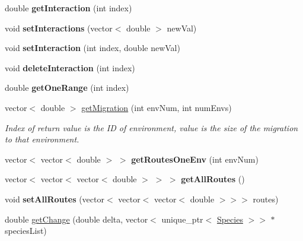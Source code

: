 \begin{DoxyCompactItemize}
\mbox{\label{classSpecies_a13bd812c3a366cf4a3bf9bd3e1e4d3fa}} 
double {\bfseries get\+Interaction} (int index)
\item 
\mbox{\label{classSpecies_a3cf0a84408e2e0e6981654dc4a9f4eeb}} 
void {\bfseries set\+Interactions} (vector$<$ double $>$ new\+Val)
\item 
\mbox{\label{classSpecies_a2158c22a9098d6591c829fb54611fc03}} 
void {\bfseries set\+Interaction} (int index, double new\+Val)
\item 
\mbox{\label{classSpecies_ab219377e317d2c8d07a0a207f52cf3f4}} 
void {\bfseries delete\+Interaction} (int index)
\item 
\mbox{\label{classSpecies_a3eeef473f91fe468ffd4d76964bb5f6f}} 
double {\bfseries get\+One\+Range} (int index)
\item 
vector$<$ double $>$ \hyperlink{classSpecies_a306aaa396cc99e223d46a577b14e1faf}{get\+Migration} (int env\+Num, int num\+Envs)
\begin{DoxyCompactList}\small\item\em Index of return value is the ID of environment, value is the size of the migration to that environment. \end{DoxyCompactList}\item 
\mbox{\label{classSpecies_a43a78cb3d46d2c02669ca80c9d0ede7b}} 
vector$<$ vector$<$ double $>$ $>$ {\bfseries get\+Routes\+One\+Env} (int env\+Num)
\item 
\mbox{\label{classSpecies_a9a0c31d84cac35b7525b38919b8ad963}} 
vector$<$ vector$<$ vector$<$ double $>$ $>$ $>$ {\bfseries get\+All\+Routes} ()
\item 
\mbox{\label{classSpecies_ac64bd2c5d579d513cca4502dddbdd484}} 
void {\bfseries set\+All\+Routes} (vector$<$ vector$<$ vector$<$ double $>$$>$$>$ routes)
\item 
\mbox{\label{classSpecies_a766219b52815e5f25206084de418385e}} 
double \hyperlink{classSpecies_a766219b52815e5f25206084de418385e}{get\+Change} (double delta, vector$<$ unique\+\_\+ptr$<$ \hyperlink{classSpecies}{Species} $>$$>$ $\ast$species\+List)
$$
\end{DoxyCompactItemize}
